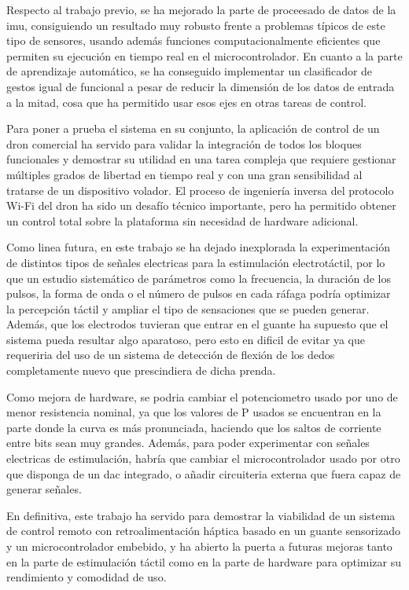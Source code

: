 \documentclass[12pt]{article}
\begin{document}
Respecto al trabajo previo, se ha mejorado la parte de proceesado de datos de la \gls{imu}, consiguiendo un resultado muy robusto frente a problemas típicos de este tipo de sensores, usando además funciones computacionalmente eficientes que permiten su ejecución en tiempo real en el microcontrolador. En cuanto a la parte de aprendizaje automático, se ha conseguido implementar un clasificador de gestos igual de funcional a pesar de reducir la dimensión de los datos de entrada a la mitad, cosa que ha permitido usar esos ejes en otras tareas de control.

Para poner a prueba el sistema en su conjunto, la aplicación de control de un dron comercial ha servido para validar la integración de todos los bloques funcionales y demostrar su utilidad en una tarea compleja que requiere gestionar múltiples grados de libertad en tiempo real y con una gran sensibilidad al tratarse de un dispositivo volador. El proceso de ingeniería inversa del protocolo Wi-Fi del dron ha sido un desafío técnico importante, pero ha permitido obtener un control total sobre la plataforma sin necesidad de hardware adicional.

Como linea futura, en este trabajo se ha dejado inexplorada la experimentación de distintos tipos de señales electricas para la estimulación electrotáctil, por lo que un estudio sistemático de parámetros como la frecuencia, la duración de los pulsos, la forma de onda o el número de pulsos en cada ráfaga podría optimizar la percepción táctil y ampliar el tipo de sensaciones que se pueden generar. Además, que los electrodos tuvieran que entrar en el guante ha supuesto que el sistema pueda resultar algo aparatoso, pero esto en dificil de evitar ya que requeriria del uso de un sistema de detección de flexión de los dedos completamente nuevo que prescindiera de dicha prenda.

Como mejora de hardware, se podria cambiar el potenciometro usado por uno de menor resistencia nominal, ya que los valores de $\mathrm{P}$ usados se encuentran en la parte donde la curva es más pronunciada, haciendo que los saltos de corriente entre bits sean muy grandes. Además, para poder experimentar con señales electricas de estimulación, habría que cambiar el microcontrolador usado por otro que disponga de un \gls{dac} integrado, o añadir circuiteria externa que fuera capaz de generar señales.

En definitiva, este trabajo ha servido para demostrar la viabilidad de un sistema de control remoto con retroalimentación háptica basado en un guante sensorizado y un microcontrolador embebido, y ha abierto la puerta a futuras mejoras tanto en la parte de estimulación táctil como en la parte de hardware para optimizar su rendimiento y comodidad de uso.
\end{document}
